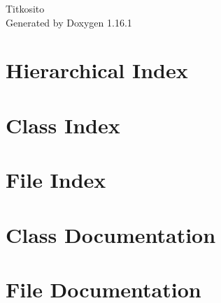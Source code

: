 \documentclass[twoside]{book}
\newcommand{\+}{\discretionary{\mbox{\scriptsize$\hookleftarrow$}}{}{}}
\newcommand{\clearemptydoublepage}{%
    \newpage{\pagestyle{empty}\cleardoublepage}%
  }
\begin{document}
  \raggedbottom
    \hypersetup{pageanchor=false,
                bookmarksnumbered=true,
                pdfencoding=unicode
               }
  \begin{titlepage}
  \vspace*{7cm}
  \begin{center}%
  {\Large Titkosito}\\
  \vspace*{1cm}
  {\large Generated by Doxygen 1.16.1}\\
  \end{center}
  \end{titlepage}
  \clearemptydoublepage
  \tableofcontents
  \clearemptydoublepage
  \hypersetup{pageanchor=true}
\chapter{Hierarchical Index}

\chapter{Class Index}

\chapter{File Index}

\chapter{Class Documentation}










\chapter{File Documentation}










  \backmatter
  \newpage
  \clearemptydoublepage
  \printindex
\end{document}
